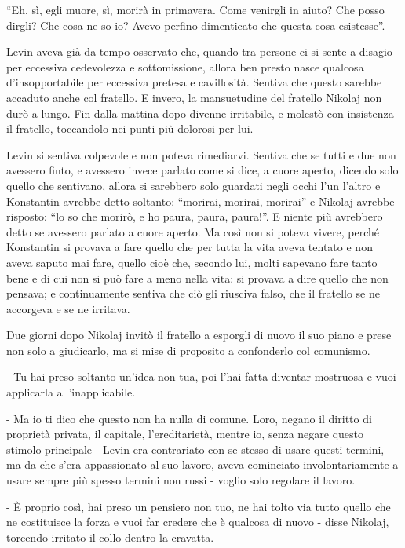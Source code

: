 ``Eh, sì, egli muore, sì, morirà in primavera. Come venirgli in aiuto? Che posso dirgli? Che cosa ne so io? Avevo perfino dimenticato che questa cosa esistesse''. 

Levin aveva già da tempo osservato che, quando tra persone ci si sente a disagio per eccessiva cedevolezza e sottomissione, allora ben presto nasce qualcosa d'insopportabile per eccessiva pretesa e cavillosità. Sentiva che questo sarebbe accaduto anche col fratello. E invero, la mansuetudine del fratello Nikolaj non durò a lungo. Fin dalla mattina dopo divenne irritabile, e molestò con insistenza il fratello, toccandolo nei punti più dolorosi per lui. 

Levin si sentiva colpevole e non poteva rimediarvi. Sentiva che se tutti e due non avessero finto, e avessero invece parlato come si dice, a cuore aperto, dicendo solo quello che sentivano, allora si sarebbero solo guardati negli occhi l'un l'altro e Konstantin avrebbe detto soltanto: ``morirai, morirai, morirai'' e Nikolaj avrebbe risposto: ``lo so che morirò, e ho paura, paura, paura!''. E niente più avrebbero detto se avessero parlato a cuore aperto. Ma così non si poteva vivere, perché Konstantin si provava a fare quello che per tutta la vita aveva tentato e non aveva saputo mai fare, quello cioè che, secondo lui, molti sapevano fare tanto bene e di cui non si può fare a meno nella vita: si provava a dire quello che non pensava; e continuamente sentiva che ciò gli riusciva falso, che il fratello se ne accorgeva e se ne irritava. 

Due giorni dopo Nikolaj invitò il fratello a esporgli di nuovo il suo piano e prese non solo a giudicarlo, ma si mise di proposito a confonderlo col comunismo. 

- Tu hai preso soltanto un'idea non tua, poi l'hai fatta diventar mostruosa e vuoi applicarla all'inapplicabile. 

- Ma io ti dico che questo non ha nulla di comune. Loro, negano il diritto di proprietà privata, il capitale, l'ereditarietà, mentre io, senza negare questo stimolo principale - Levin era contrariato con se stesso di usare questi termini, ma da che s'era appassionato al suo lavoro, aveva cominciato involontariamente a usare sempre più spesso termini non russi - voglio solo regolare il lavoro. 

- È proprio così, hai preso un pensiero non tuo, ne hai tolto via tutto quello che ne costituisce la forza e vuoi far credere che è qualcosa di nuovo - disse Nikolaj, torcendo irritato il collo dentro la cravatta. 

